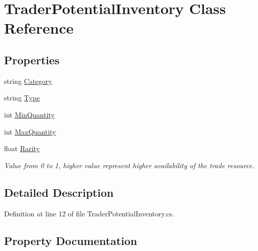 \hypertarget{class_trader_potential_inventory}{}\section{Trader\+Potential\+Inventory Class Reference}
\label{class_trader_potential_inventory}
\subsection*{Properties}
\begin{DoxyCompactItemize}
\item 
string \hyperlink{class_trader_potential_inventory_a3d46f8615e6c925d009060b24f20e653}{Category}
\item 
string \hyperlink{class_trader_potential_inventory_aee63998c8dc738038218ae26d6db2892}{Type}
\item 
int \hyperlink{class_trader_potential_inventory_af9991d72c0c227f809ba6f7be2793b12}{Min\+Quantity}
\item 
int \hyperlink{class_trader_potential_inventory_a7e64275d46ee6668e7873c992f76009d}{Max\+Quantity}
\item 
float \hyperlink{class_trader_potential_inventory_a3cb2e2a3dd376d0d3d3f51aba216bb90}{Rarity}
\begin{DoxyCompactList}\small\item\em Value from 0 to 1, higher value represent higher availability of the trade resource. \end{DoxyCompactList}\end{DoxyCompactItemize}


\subsection{Detailed Description}


Definition at line 12 of file Trader\+Potential\+Inventory.\+cs.



\subsection{Property Documentation}
\mbox{\label{class_trader_potential_inventory_a3d46f8615e6c925d009060b24f20e653}} 
